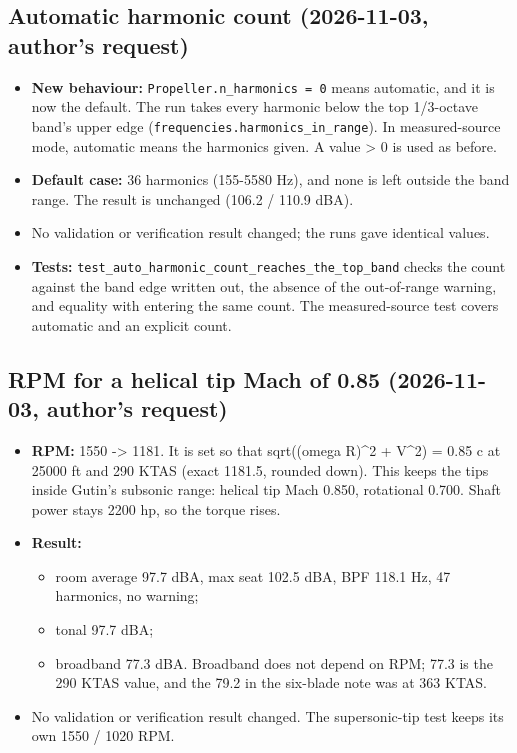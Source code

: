\documentclass[10pt,a4paper]{article}
\begin{document}
\subsection*{Automatic harmonic count (2026-11-03, author's request)}

\begin{itemize}
\item \textbf{New behaviour:} \texttt{Propeller.\allowbreak{}n\_\allowbreak{}harmonics = 0} means automatic, and it is now the default. The run takes every harmonic below the top 1/3-octave band's upper edge (\texttt{frequencies.\allowbreak{}harmonics\_\allowbreak{}in\_\allowbreak{}range}). In measured-source mode, automatic means the harmonics given. A value > 0 is used as before.
\item \textbf{Default case:} 36 harmonics (155-5580 Hz), and none is left outside the band range. The result is unchanged (106.2 / 110.9 dBA).
\item No validation or verification result changed; the runs gave identical values.
\item \textbf{Tests:} \texttt{test\_\allowbreak{}auto\_\allowbreak{}harmonic\_\allowbreak{}count\_\allowbreak{}reaches\_\allowbreak{}the\_\allowbreak{}top\_\allowbreak{}band} checks the count against the band edge written out, the absence of the out-of-range warning, and equality with entering the same count. The measured-source test covers automatic and an explicit count.
\end{itemize}

\subsection*{RPM for a helical tip Mach of 0.85 (2026-11-03, author's request)}

\begin{itemize}
\item \textbf{RPM:} 1550 -> 1181. It is set so that sqrt((omega R)\textasciicircum{}2 + V\textasciicircum{}2) = 0.85 c at 25000 ft and 290 KTAS (exact 1181.5, rounded down). This keeps the tips inside Gutin's subsonic range: helical tip Mach 0.850, rotational 0.700. Shaft power stays 2200 hp, so the torque rises.
\item \textbf{Result:}
\begin{itemize}
\item room average 97.7 dBA, max seat 102.5 dBA, BPF 118.1 Hz, 47 harmonics, no warning;
\item tonal 97.7 dBA;
\item broadband 77.3 dBA. Broadband does not depend on RPM; 77.3 is the 290 KTAS value, and the 79.2 in the six-blade note was at 363 KTAS.
\end{itemize}
\item No validation or verification result changed. The supersonic-tip test keeps its own 1550 / 1020 RPM.
\end{itemize}
\end{document}
